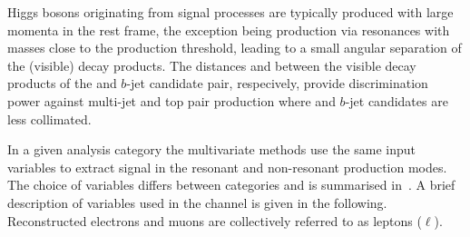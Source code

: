 Higgs bosons originating from signal processes are typically produced
with large momenta in the \HH rest frame, the exception being \HH
production via resonances with masses close to the \HH production
threshold, leading to a small angular separation of the (visible)
\PHiggs decay products. The distances \dRtautau and \dRbb between the
visible decay products of the \taulepton and $b$-jet candidate pair,
respecively, provide discrimination power against multi-jet and top
pair production where \taulepton and $b$-jet candidates are less
collimated.

In a given analysis category the multivariate methods use the same
input variables to extract \HH signal in the resonant and non-resonant
production modes. The choice of variables differs between categories
and is summarised in~. A brief description of
variables used in the \lephad channel is given in the following.
Reconstructed electrons and muons are collectively referred to as
leptons ($\ell$).
